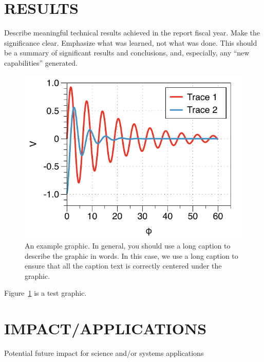 \documentclass{onrannual}
\begin{document}
\section{RESULTS}
Describe meaningful technical results achieved in the report fiscal year. Make the significance clear. Emphasize what
was learned, not what was done. This should be a summary of significant results and conclusions, and, especially, any
``new capabilities'' generated.

\begin{figure}
    \begin{center}
        \includegraphics{samplefigure}
    \end{center}
    \caption{An example graphic. In general, you should use a long caption to describe the graphic in words. In this
    case, we use a long caption to ensure that all the caption text is correctly centered under the graphic.}
    \label{fig:label}
\end{figure}

Figure~\ref{fig:label} is a test graphic.


\section{IMPACT/APPLICATIONS}
Potential future impact for science and/or systems applications
\end{document}
